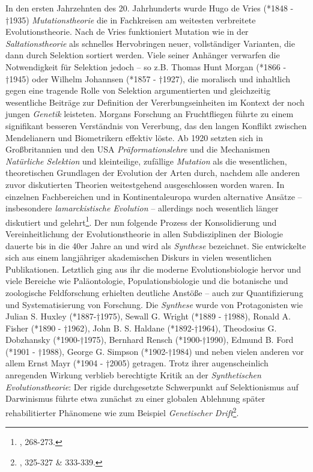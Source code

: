 \documentclass[openany,twoside,twocolumn]{book}
\let\rmarkdownfootnote\footnote%
\def\footnote{\protect\rmarkdownfootnote}
\begin{document}
In den ersten Jahrzehnten des 20. Jahrhunderts wurde Hugo de Vries
(*1848 - †1935) \emph{Mutationstheorie} die in Fachkreisen am weitesten
verbreitete Evolutionstheorie. Nach de Vries funktioniert Mutation wie
in der \emph{Saltationstheorie} als schnelles Hervobringen neuer,
vollständiger Varianten, die dann durch Selektion sortiert werden. Viele
seiner Anhänger verwarfen die Notwendigkeit für Selektion jedoch -- so
z.B. Thomas Hunt Morgan (*1866 - †1945) oder Wilhelm Johannsen (*1857 -
†1927), die moralisch und inhaltlich gegen eine tragende Rolle von
Selektion argumentierten und gleichzeitig wesentliche Beiträge zur
Definition der Vererbungseinheiten im Kontext der noch jungen
\emph{Genetik} leisteten. Morgans Forschung an Fruchtfliegen führte zu
einem signifikant besseren Verständnis von Vererbung, das den langen
Konflikt zwischen Mendelianern und Biometrikern effektiv löste. Ab 1920
setzten sich in Großbritannien und den USA \emph{Präformationslehre} und
die Mechanismen \emph{Natürliche Selektion} und kleinteilige, zufällige
\emph{Mutation} als die wesentlichen, theoretischen Grundlagen der
Evolution der Arten durch, nachdem alle anderen zuvor diskutierten
Theorien weitestgehend ausgeschlossen worden waren. In einzelnen
Fachbereichen und in Kontinentaleuropa wurden alternative Ansätze --
insbesondere \emph{lamarckistische Evolution} -- allerdings noch
wesentlich länger diskutiert und gelehrt\footnote{\textcite{bowler_evolution_1989},
  268-273.}. Der nun folgende Prozess der Konsolidierung und
Vereinheitlichung der Evolutionstheorie in allen Subdisziplinen der
Biologie dauerte bis in die 40er Jahre an und wird als \emph{Synthese}
bezeichnet. Sie entwickelte sich aus einem langjähriger akademischen
Diskurs in vielen wesentlichen Publikationen. Letztlich ging aus ihr die
moderne Evolutionsbiologie hervor und viele Bereiche wie Paläontologie,
Populationsbiologie und die botanische und zoologische Feldforschung
erhielten deutliche Anstöße -- auch zur Quantifizierung und
Systematisierung von Forschung. Die \emph{Synthese} wurde von
Protagonisten wie Julian S. Huxley (*1887-†1975), Sewall G. Wright
(*1889 - †1988), Ronald A. Fisher (*1890 - †1962), John B. S. Haldane
(*1892-†1964), Theodosius G. Dobzhansky (*1900-†1975), Bernhard Rensch
(*1900-†1990), Edmund B. Ford (*1901 - †1988), George G. Simpson
(*1902-†1984) und neben vielen anderen vor allem Ernst Mayr (*1904 -
†2005) getragen. Trotz ihrer augenscheinlich anregenden Wirkung verblieb
berechtigte Kritik an der \emph{Synthetischen Evolutionstheorie}: Der
rigide durchgesetzte Schwerpunkt auf Selektionismus auf Darwinismus
führte etwa zunächst zu einer globalen Ablehnung später rehabilitierter
Phänomene wie zum Beispiel \emph{Genetischer Drift}\footnote{\textcite{bowler_evolution_1989},
  325-327 \& 333-339.}.
\end{document}
